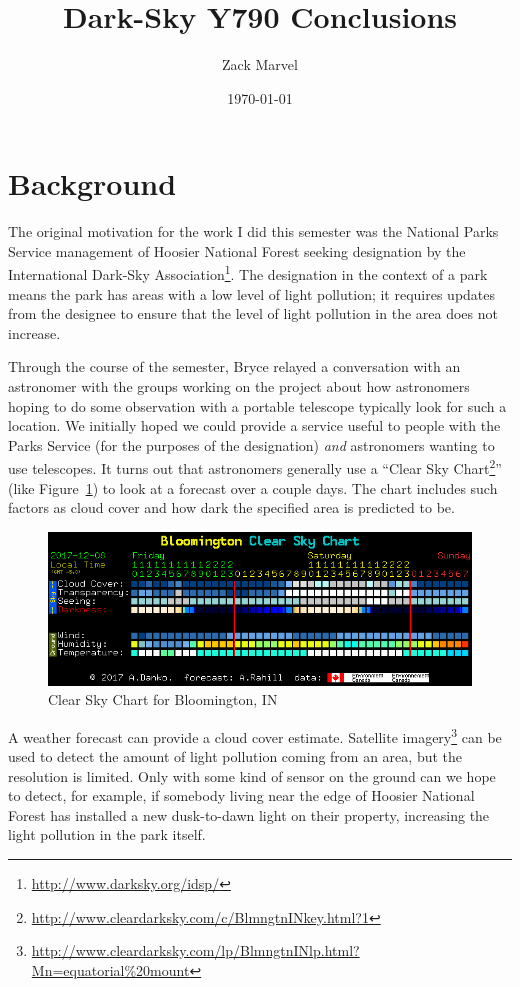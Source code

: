 \documentclass{article}
\title{Dark-Sky Y790 Conclusions}
\author{Zack Marvel}
\date{\today}
\begin{document}
\maketitle

\section*{Background}
The original motivation for the work I did this semester was the National Parks Service management of Hoosier National Forest seeking designation by the International Dark-Sky Association\footnote{\url{http://www.darksky.org/idsp/}}. The designation in the context of a park means the park has areas with a low level of light pollution; it requires updates from the designee to ensure that the level of light pollution in the area does not increase.

Through the course of the semester, Bryce relayed a conversation with an astronomer with the groups working on the project about how astronomers hoping to do some observation with a portable telescope typically look for such a location. We initially hoped we could provide a service useful to people with the Parks Service (for the purposes of the designation) \emph{and} astronomers wanting to use telescopes. It turns out that astronomers generally use a ``Clear Sky Chart\footnote{\url{http://www.cleardarksky.com/c/BlmngtnINkey.html?1}}'' (like Figure~\ref{fig:clear_sky_chart}) to look at a forecast over a couple days. The chart includes such factors as cloud cover and how dark the specified area is predicted to be.

% 
\begin{figure}[h]
  \centering
  \includegraphics[scale=0.5]{bloomington_clear_sky_chart}
  \caption{Clear Sky Chart for Bloomington, IN} \label{fig:clear_sky_chart}
\end{figure}

A weather forecast can provide a cloud cover estimate. Satellite imagery\footnote{\url{http://www.cleardarksky.com/lp/BlmngtnINlp.html?Mn=equatorial\%20mount}} can be used to detect the amount of light pollution coming from an area, but the resolution is limited. Only with some kind of sensor on the ground can we hope to detect, for example, if somebody living near the edge of Hoosier National Forest has installed a new dusk-to-dawn light on their property, increasing the light pollution in the park itself.
\end{document}

